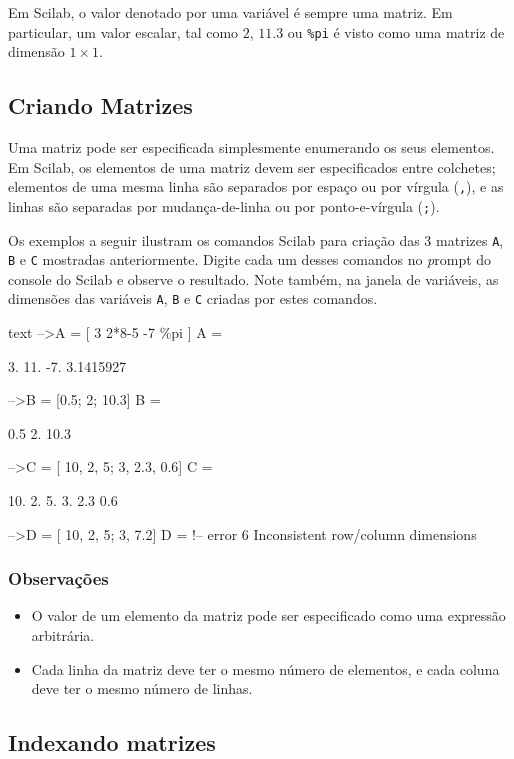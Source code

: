\documentclass[11pt]{practice}
\begin{document}
Em Scilab, o valor denotado por uma variável é sempre uma matriz. Em
particular, um valor escalar, tal como $2$, $11.3$ ou \texttt{\%pi} é
visto como uma matriz de dimensão $1\times 1$.

\subsection{Criando Matrizes}

Uma matriz pode ser especificada simplesmente enumerando os seus
elementos. Em Scilab, os elementos de uma matriz devem ser especificados
entre colchetes; elementos de uma mesma linha são separados por espaço
ou por vírgula (\texttt{,}), e as linhas são separadas por
mudança-de-linha ou por ponto-e-vírgula (\texttt{;}).

Os exemplos a seguir ilustram os comandos Scilab para criação das 3
matrizes \texttt{A}, \texttt{B} e \texttt{C} mostradas
anteriormente. Digite cada um desses comandos no {\emph prompt} do
console do Scilab e observe o resultado. Note também, na janela de
variáveis, as dimensões das variáveis \texttt{A}, \texttt{B} e
\texttt{C} criadas por estes comandos.

\begin{lst}{text}
-->A = [ 3  2*8-5  -7 \%pi ]
 A =
 
     3.    11.    -7.    3.1415927  

-->B = [0.5; 2; 10.3] 
 B  =
 
      0.5
      2.
      10.3
 
-->C = [ 10, 2, 5; 3, 2.3, 0.6]
 C  =
 
     10.    2.      5.
     3.      2.3    0.6
     
-->D = [ 10, 2, 5; 3, 7.2]
 D  =
                       !-- error 6
Inconsistent row/column dimensions
\end{lst} 

\subsubsection*{Observações}
\begin{itemize}
  \item O valor de um elemento da matriz pode ser especificado como uma
  expressão arbitrária.
  \item Cada linha da matriz deve ter o mesmo número de elementos, e
  cada coluna deve ter o mesmo número de linhas.
\end{itemize}  

\subsection{Indexando matrizes}
\end{document}
